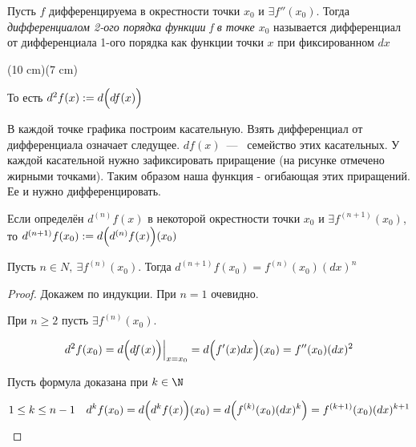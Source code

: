 \begin{definition}
	Пусть $f$ дифференцируема в окрестности точки $x_{0}$ и $\exists f''(x_{0})$. Тогда \textit{дифференциалом 2-ого порядка функции f в точке $x_{0}$} называется дифференциал от дифференциала 1-ого порядка как функции точки $x$ при фиксированном $dx$
\end{definition}

\sidefig(10 cm)(7 cm)
{
	\begin{flushleft}
		То есть $d^2 f(x) := d\Bigl(df(x)\Bigr)$
		
		В каждой точке графика построим касательную. Взять дифференциал от дифференциала означает следущее. $df(x)$~---~ семейство этих касательных. У каждой касательной нужно зафиксировать приращение (на рисунке отмечено жирными точками). Таким образом наша функция - огибающая этих приращений. Ее и нужно дифференцировать.
	\end{flushleft}
}
{
	
}




\begin{definition}
	Если определён $d^{(n)}f(x)$ в некоторой окрестности точки $x_{0}$ и $\exists f^{(n+1)}(x_{0})$, то $d^{(n+1)} f(x_{0}) :=  d\Bigl(d^{(n)}f(x)\Bigr)(x_{0})$
\end{definition}

\begin{theorem}
	Пусть $n\in N, \ \exists f^{(n)}(x_{0})$. Тогда  $d^{(n+1)} f(x_{0}) = f^{(n)}(x_{0}) (dx)^{n}$ 
\end{theorem}
\begin{proof}
	Докажем по индукции. При $n = 1$ очевидно.
	
	При $n \geq 2$ пусть $\exists f^{(n)}(x_{0})$.
	
	$$
	d^{2} f(x_{0}) = d\Bigl(df(x)\Bigr) \Bigr|_{x = x_{0}} = d\Bigl(f'(x)dx\Bigr)(x_{0}) = f''(x_{0})(dx)^{2}
	$$
	
	Пусть формула доказана при $k \in \N$
	
	$$
	1 \leq k\leq n-1 \quad d^{k} f(x_{0}) = d\Bigl(d^{k} f(x)\Bigr)(x_{0}) = d\Bigl(f^{(k)}(x_{0}) (dx)^{k}\Bigr) = f^{(k +1)}(x_{0})(dx)^{k+1}
	$$
	
\end{proof}